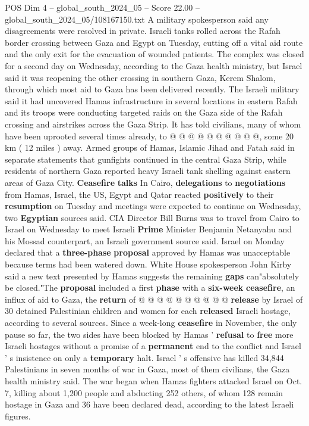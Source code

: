 \begin{textsample}{POS Dim 4 – global\_south\_2024\_05 – Score 22.00 – global\_south\_2024\_05/108167150.txt}
A military spokesperson said any disagreements were resolved in private.
Israeli tanks rolled across the Rafah border crossing between Gaza and Egypt on Tuesday, cutting off a vital aid route and the only exit for the evacuation of wounded patients.
The complex was closed for a second day on Wednesday, according to the Gaza health ministry, but Israel said it was reopening the other crossing in southern Gaza, Kerem Shalom, through which most aid to Gaza has been delivered recently.
The Israeli military said it had uncovered Hamas infrastructure in several locations in eastern Rafah and its troops were conducting targeted raids on the Gaza side of the Rafah crossing and airstrikes across the Gaza Strip.
It has told civilians, many of whom have been uprooted several times already, to @ @ @ @ @ @ @ @ @ @, some 20 km ( 12 miles ) away.
Armed groups of Hamas, Islamic Jihad and Fatah said in separate statements that gunfights continued in the central Gaza Strip, while residents of northern Gaza reported heavy Israeli tank shelling against eastern areas of Gaza City. \textbf{Ceasefire} \textbf{talks} In Cairo, \textbf{delegations} to \textbf{negotiations} from Hamas, Israel, the US, Egypt and Qatar reacted \textbf{positively} to their \textbf{resumption} on Tuesday and meetings were expected to continue on Wednesday, two \textbf{Egyptian} sources said.
CIA Director Bill Burns was to travel from Cairo to Israel on Wednesday to meet Israeli \textbf{Prime} Minister Benjamin Netanyahu and his Mossad counterpart, an Israeli government source said.
Israel on Monday declared that a \textbf{three-phase} \textbf{proposal} approved by Hamas was unacceptable because terms had been watered down.
White House spokesperson John Kirby said a new text presented by Hamas suggests the remaining \textbf{gaps} can"absolutely be closed."The \textbf{proposal} included a first \textbf{phase} with a \textbf{six-week} \textbf{ceasefire}, an influx of aid to Gaza, the \textbf{return} of @ @ @ @ @ @ @ @ @ @ \textbf{release} by Israel of 30 detained Palestinian children and women for each \textbf{released} Israeli hostage, according to several sources.
Since a week-long \textbf{ceasefire} in November, the only pause so far, the two sides have been blocked by Hamas ' \textbf{refusal} to \textbf{free} more Israeli hostages without a promise of a \textbf{permanent} end to the conflict and Israel ' s insistence on only a \textbf{temporary} halt.
Israel ' s offensive has killed 34,844 Palestinians in seven months of war in Gaza, most of them civilians, the Gaza health ministry said.
The war began when Hamas fighters attacked Israel on Oct. 7, killing about 1,200 people and abducting 252 others, of whom 128 remain hostage in Gaza and 36 have been declared dead, according to the latest Israeli figures.

\end{textsample}
